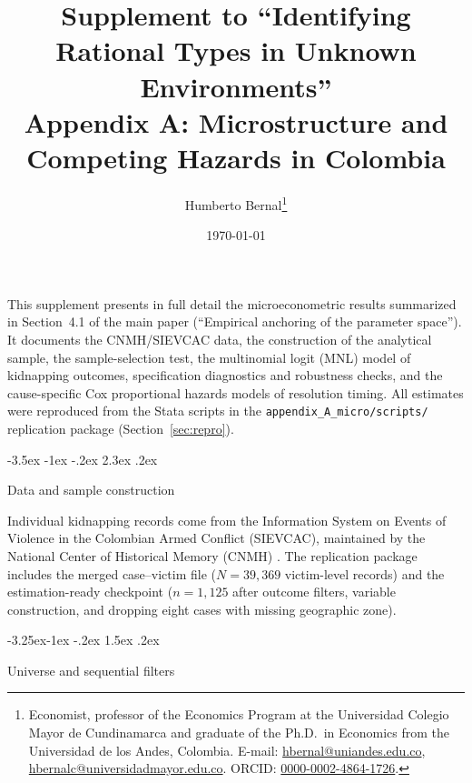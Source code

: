 \documentclass[12pt]{article}
\makeatletter
\numberwithin{equation}{section}
\numberwithin{table}{section}
\renewcommand\section{\@startsection {section}{1}{\z@}%
                                   {-3.5ex \@plus -1ex \@minus -.2ex}%
                                   {2.3ex \@plus.2ex}%
                                   {\normalfont\Large\bfseries\raggedright}}
\renewcommand\subsection{\@startsection{subsection}{2}{\z@}%
                                     {-3.25ex\@plus -1ex \@minus -.2ex}%
                                     {1.5ex \@plus .2ex}%
                                     {\normalfont\large\bfseries\raggedright}}
\makeatother
\begin{document}
\title{Supplement to ``Identifying Rational Types in Unknown Environments''\\
Appendix A: Microstructure and Competing Hazards in Colombia}
\author{Humberto Bernal\thanks{Economist, professor of the Economics Program at the Universidad Colegio Mayor de Cundinamarca and graduate of the Ph.D.\ in Economics from the Universidad de los Andes, Colombia. E-mail: \href{mailto:hbernal@uniandes.edu.co}{hbernal@uniandes.edu.co}, \href{mailto:hbernalc@universidadmayor.edu.co}{hbernalc@universidadmayor.edu.co}. ORCID: \href{https://orcid.org/0000-0002-4864-1726}{0000-0002-4864-1726}.}}
\date{\today}
\maketitle

\noindent
This supplement presents in full detail the microeconometric results
summarized in Section~4.1 of the main paper (``Empirical anchoring of the
parameter space''). It documents the CNMH/SIEVCAC data, the construction
of the analytical sample, the sample-selection test, the multinomial logit
(MNL) model of kidnapping outcomes, specification diagnostics and robustness
checks, and the cause-specific Cox proportional hazards models of resolution
timing. All estimates were reproduced from the Stata scripts in the
\texttt{appendix\_A\_micro/scripts/} replication package (Section~\ref{sec:repro}).

\section{Data and sample construction}
\label{sec:data}

Individual kidnapping records come from the Information System on Events of
Violence in the Colombian Armed Conflict (SIEVCAC), maintained by the
National Center of Historical Memory (CNMH) \citep{cnmh_datos,CNMH2013}.
The replication package includes the merged case--victim file
 ($N=39{,}369$ victim-level records) and the
estimation-ready checkpoint  ($n=1{,}125$
after outcome filters, variable construction, and dropping eight cases with
missing geographic zone).

\subsection{Universe and sequential filters}
\end{document}
